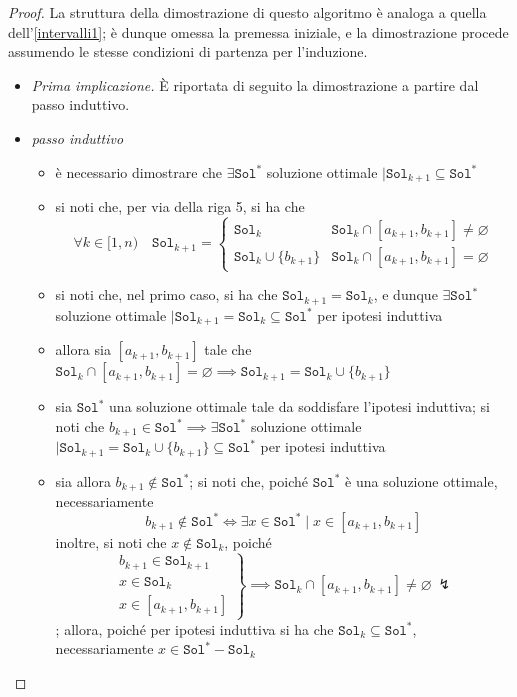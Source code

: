 \documentclass[14pt]{extreport}
\theoremstyle{definition}
\theoremstyle{definition}
\begin{document}
\begin{proof}
    La struttura della dimostrazione di questo algoritmo è analoga a quella dell'\cref{intervalli1}; è dunque omessa la premessa iniziale, e la dimostrazione procede assumendo le stesse condizioni di partenza per l'induzione.

    \begin{itemize}
        \item[] \textit{Prima implicazione.} È riportata di seguito la dimostrazione a partire dal passo induttivo. 
        \item \textit{passo induttivo}
            \begin{itemize}
                \item è necessario dimostrare che $\exists \texttt{Sol}^*$ soluzione ottimale $\mid \texttt{Sol}_{k + 1} \subseteq \texttt{Sol}^*$
                \item si noti che, per via della riga 5, si ha che $$\forall k \in [1, n) \quad \texttt{Sol}_{k +1} = \left \{ \begin{array}{ll} \texttt{Sol}_k & \texttt{Sol}_k \cap [a_{k +1}, b_{k+1}] \neq \varnothing \\ \texttt{Sol}_k \cup \{b_{k +1}\} & \texttt{Sol}_k \cap [a_{k +1}, b_{k +1}] = \varnothing \end{array} \right.$$
                \item si noti che, nel primo caso, si ha che $\texttt{Sol}_{k +1} = \texttt{Sol}_k$, e dunque $\exists \texttt{Sol}^*$ soluzione ottimale $\mid \texttt{Sol}_{k +1} = \texttt{Sol}_k \subseteq \texttt{Sol}^*$ per ipotesi induttiva
                \item allora sia $[a_{k+1}, b_{k+1}]$ tale che $\texttt{Sol}_k \cap [a_{k+1}, b_{k +1}] = \varnothing \implies \texttt{Sol}_{k +1} = \texttt{Sol}_k \cup \{b_{k +1}\}$
                \item sia $\texttt{Sol}^*$ una soluzione ottimale tale da soddisfare l'ipotesi induttiva; si noti che $b_{k +1} \in \texttt{Sol}^* \implies \exists \texttt{Sol}^*$ soluzione ottimale $\mid \texttt{Sol}_{k +1} = \texttt{Sol}_k \cup \{ b_{k +1}\} \subseteq \texttt{Sol}^*$ per ipotesi induttiva
                \item sia allora $b_{k +1} \notin \texttt{Sol}^*$; si noti che, poiché $\texttt{Sol}^*$ è una soluzione ottimale, necessariamente $$b_{k +1} \notin \texttt{Sol}^* \iff \exists x \in \texttt{Sol}^*  \mid x \in [a_{k + 1}, b_{k +1}]$$ inoltre, si noti che $x \notin \texttt{Sol}_k$, poiché $$\left . \begin{array}{r} b_{k +1} \in \texttt{Sol}_{k +1} \\ x \in \texttt{Sol}_k \\ x \in [a_{k +1}, b_{ k+1}] \end{array} \right \} \implies \texttt{Sol}_k \cap [a_{k +1}, b_{k +1}] \neq \varnothing \ \lightning$$; allora, poiché per ipotesi induttiva si ha che $\texttt{Sol}_k \subseteq \texttt{Sol}^*$, necessariamente $x \in \texttt{Sol}^* - \texttt{Sol}_k$

\end{itemize}
\end{itemize}
\end{proof}
\end{document}
